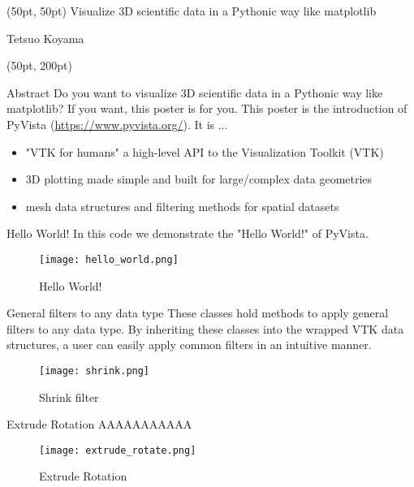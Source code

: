 \documentclass[final]{beamer}
\begin{document}
\begin{frame}
\begin{textblock*}{3450pt}(50pt, 50pt)
\Huge Visualize 3D scientific data in a Pythonic way like matplotlib

\Large Tetsuo Koyama
\end{textblock*}

\begin{textblock*}{800pt}(50pt, 200pt)
\begin{block}{Abstract}
Do you want to visualize 3D scientific data in a Pythonic way like matplotlib?
If you want, this poster is for you.
This poster is the introduction of PyVista (\url{https://www.pyvista.org/}).
It is ...
\begin{itemize}
\item "VTK for humans"\: a high-level API to the Visualization Toolkit (VTK)
\item 3D plotting made simple and built for large/complex data geometries
\item mesh data structures and filtering methods for spatial datasets
\end{itemize}

\end{block}
\begin{block}{Hello World!}
In this code we demonstrate the "Hello World!" of PyVista.


\begin{figure}
\texttt{[image: hello\_world.png]}
\caption{Hello World!}
\end{figure}
\end{block}
\begin{block}{General filters to any data type}
These classes hold methods to apply general filters to any data type.
By inheriting these classes into the wrapped VTK data structures, a user can easily apply common filters in an intuitive manner.

\begin{figure}
\texttt{[image: shrink.png]}
\caption{Shrink filter}
\end{figure}
\end{block}
\begin{block}{Extrude Rotation}
AAAAAAAAAAA

\begin{figure}
\texttt{[image: extrude\_rotate.png]}
\caption{Extrude Rotation}
\end{figure}
\end{block}
\end{textblock*}


\end{frame}
\end{document}
